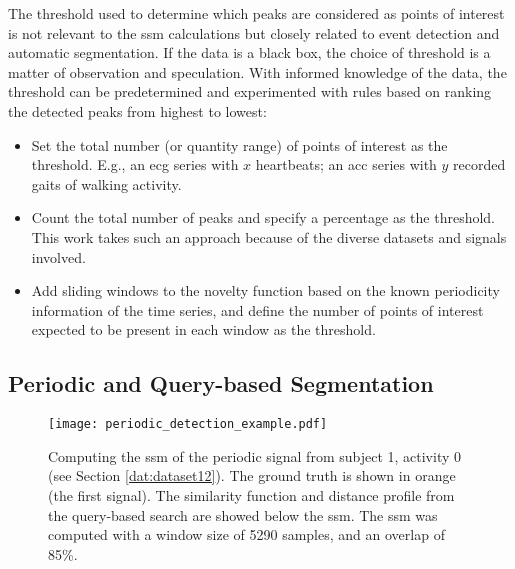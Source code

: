 The threshold used to determine which peaks are considered as points of interest is not relevant to the \gls{ssm} calculations but closely related to event detection and automatic segmentation. If the data is a black box, the choice of threshold is a matter of observation and speculation. With informed knowledge of the data, the threshold can be predetermined and experimented with rules based on ranking the detected peaks from highest to lowest:

\begin{itemize}
    \item Set the total number (or quantity range) of points of interest as the threshold. E.g., an \gls{ecg} series with $x$ heartbeats; an \gls{acc} series with $y$ recorded gaits of walking activity.
    \item Count the total number of peaks and specify a percentage as the threshold. This work takes such an approach because of the diverse datasets and signals involved.
    \item Add sliding windows to the novelty function based on the known periodicity information of the time series, and define the number of points of interest expected to be present in each window as the threshold.
\end{itemize}

\subsection{Periodic and Query-based Segmentation}


\begin{figure}
\centering
\texttt{[image: periodic\_detection\_example.pdf]}
\caption{Computing the \gls{ssm} of the periodic signal from subject 1, activity 0 (see Section \ref{dat:dataset12}). The ground truth is shown in orange (the first signal). The similarity function and distance profile from the query-based search are showed below the \gls{ssm}. The \gls{ssm} was computed with a window size of 5290 samples, and an overlap of 85\%.}
\label{fig:periodic_detection}
\end{figure}


